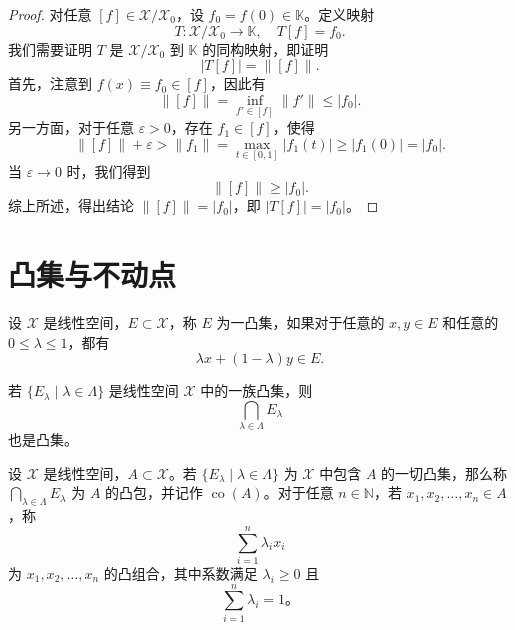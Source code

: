 \documentclass[lang=cn,newtx,10pt,scheme=chinese,thmcnt=chapter]{elegantbook}
\begin{document}
\begin{proof}
对任意 $[f] \in \mathscr{X} / \mathscr{X}_0$，设 $f_0 = f(0) \in \mathbb{K}$。定义映射
\[
T: \mathscr{X} / \mathscr{X}_0 \rightarrow \mathbb{K}, \quad T[f] = f_0.
\]
我们需要证明 $T$ 是 $\mathscr{X} / \mathscr{X}_0$ 到 $\mathbb{K}$ 的同构映射，即证明
\[
|T[f]| = \|[f]\|.
\]
首先，注意到 $f(x) \equiv f_0 \in [f]$，因此有
\[
\|[f]\| = \inf_{f' \in [f]} \|f'\| \leqslant |f_0|.
\]
另一方面，对于任意 $\varepsilon > 0$，存在 $f_1 \in [f]$，使得
\[
\|[f]\| + \varepsilon > \|f_1\| = \max_{t \in [0,1]} |f_1(t)| \geqslant |f_1(0)| = |f_0|.
\]
当 $\varepsilon \rightarrow 0$ 时，我们得到
\[
\|[f]\| \geqslant |f_0|.
\]
综上所述，得出结论 $\|[f]\| = |f_0|$，即 $|T[f]| = |f_0|$。
\end{proof}
\section{凸集与不动点}

\begin{definition}
设 $\mathscr{X}$ 是线性空间，$E \subset \mathscr{X}$，称 $E$ 为一凸集，如果对于任意的 $x, y \in E$ 和任意的 $0 \leqslant \lambda \leqslant 1$，都有
\[
\lambda x + (1-\lambda) y \in E.
\]
\end{definition}

\begin{proposition}
若 $\{E_\lambda \mid \lambda \in \Lambda\}$ 是线性空间 $\mathscr{X}$ 中的一族凸集，则
\[
\bigcap_{\lambda \in \Lambda} E_\lambda
\]
也是凸集。
\end{proposition}


\begin{definition}
设 $\mathscr{X}$ 是线性空间，$A \subset \mathscr{X}$。若 $\{E_\lambda \mid \lambda \in \Lambda\}$ 为 $\mathscr{X}$ 中包含 $A$ 的一切凸集，那么称 $\bigcap_{\lambda \in \Lambda} E_\lambda$ 为 $A$ 的凸包，并记作 $\operatorname{co}(A)$。对于任意 $n \in \mathbb{N}$，若 $x_1, x_2, \dots, x_n \in A$，称
\[
\sum_{i=1}^n \lambda_i x_i
\]
为 $x_1, x_2, \dots, x_n$ 的凸组合，其中系数满足 $\lambda_i \geqslant 0$ 且
\[
\sum_{i=1}^n \lambda_i = 1。
\]
\end{definition}
\end{document}

